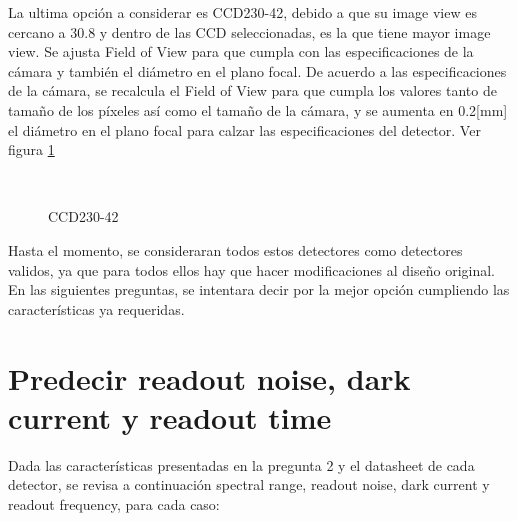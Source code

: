 \documentclass[a4paper,10pt]{article}
\begin{document}
La ultima opción a considerar es CCD230-42, debido a que su image view es
cercano a 30.8 y dentro de las CCD seleccionadas, es la que tiene mayor image
view. Se ajusta Field of View para que cumpla con las especificaciones de la
cámara y también el diámetro en el plano focal. De acuerdo a las
especificaciones de la cámara, se recalcula el Field of View para que cumpla
los valores tanto de tamaño de los píxeles así como el tamaño de la cámara, y
se aumenta en 0.2[mm] el diámetro en el plano focal para calzar las
especificaciones del detector.
Ver figura \ref{fig:ccd230p2}
\begin{figure}[ht!]
  \centering
  ~ 
  ~ 
  \caption{CCD230-42}
  \label{fig:ccd230p2}
\end{figure}

Hasta el momento, se consideraran todos estos detectores como detectores
validos, ya que para todos ellos hay que hacer modificaciones al diseño
original. En las siguientes preguntas, se intentara decir por la mejor opción
cumpliendo las características ya requeridas.
\section{Predecir readout noise, dark current y readout time}
Dada las características presentadas en la pregunta 2 y el datasheet de cada
detector, se revisa a continuación spectral range, readout noise, dark current y readout
frequency, para cada caso:
\end{document}
